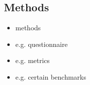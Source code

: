 \subsection{Methods}

\begin{itemize}
    \item methods
    \item e.g. questionnaire
    \item e.g. metrics
    \item e.g. certain benchmarks
\end{itemize}

